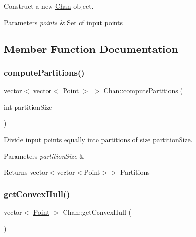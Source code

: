 Construct a new \mbox{\hyperlink{classChan}{Chan}} object. 


\begin{DoxyParams}{Parameters}
{\em points} & Set of input points \\
\hline
\end{DoxyParams}


\subsection{Member Function Documentation}
\mbox{\label{classChan_a767dbe606a11c923d4effd7250529900}} 
\subsubsection{\texorpdfstring{compute\+Partitions()}{computePartitions()}}
{\footnotesize\ttfamily vector$<$ vector$<$ \mbox{\hyperlink{classPoint}{Point}} $>$ $>$ Chan\+::compute\+Partitions (\begin{DoxyParamCaption}\item[{int}]{partition\+Size }\end{DoxyParamCaption})\hspace{0.3cm}{\ttfamily [private]}}



Divide input points equally into partitions of size \textquotesingle{}partition\+Size\textquotesingle{}. 


\begin{DoxyParams}{Parameters}
{\em partition\+Size} & \\
\hline
\end{DoxyParams}
\begin{DoxyReturn}{Returns}
vector$<$vector$<$\+Point$>$$>$ Partitions 
\end{DoxyReturn}
\mbox{\label{classChan_a1382d15aa44de4e9182f2cc74cbf1dea}} 
\subsubsection{\texorpdfstring{get\+Convex\+Hull()}{getConvexHull()}}
{\footnotesize\ttfamily vector$<$ \mbox{\hyperlink{classPoint}{Point}} $>$ Chan\+::get\+Convex\+Hull (\begin{DoxyParamCaption}{ }\end{DoxyParamCaption})}



